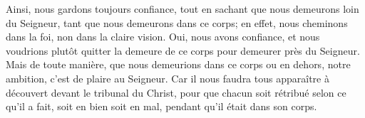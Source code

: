Ainsi, nous gardons toujours confiance,
	tout en sachant que nous demeurons loin du Seigneur,
	tant que nous demeurons dans ce corps;
	en effet, nous cheminons dans la foi, non dans la claire vision.
Oui, nous avons confiance,
	et nous voudrions plutôt quitter la demeure de ce corps
		pour demeurer près du Seigneur.
Mais de toute manière, que nous demeurions dans ce corps ou en dehors,
	notre ambition, c’est de plaire au Seigneur.
Car il nous faudra tous apparaître à découvert devant le tribunal du Christ,
	pour que chacun soit rétribué selon ce qu’il a fait,
		soit en bien soit en mal,
	pendant qu’il était dans son corps.
